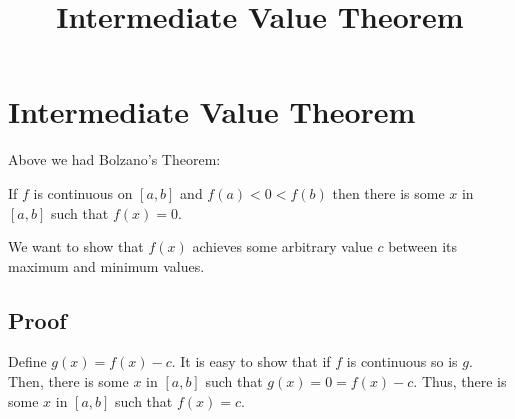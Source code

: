 \documentclass[11pt, oneside]{article}
\title{Intermediate Value Theorem}
\date{}
\begin{document}
\maketitle
\Large

\section{Intermediate Value Theorem}

Above we had Bolzano's Theorem:

If $f$ is continuous on $[a,b]$ and $f(a) < 0 < f(b)$ then there is some $x$ in $[a,b]$ such that $f(x) = 0$.

We want to show that $f(x)$ achieves some arbitrary value $c$ between its maximum and minimum values.

\subsection*{Proof}

Define $g(x) = f(x) - c$.  It is easy to show that if $f$ is continuous so is $g$.  Then, there is some $x$ in $[a,b]$ such that $g(x) = 0 = f(x) - c$.  Thus, there is some $x$ in $[a,b]$ such that $f(x) = c$.
\end{document}
